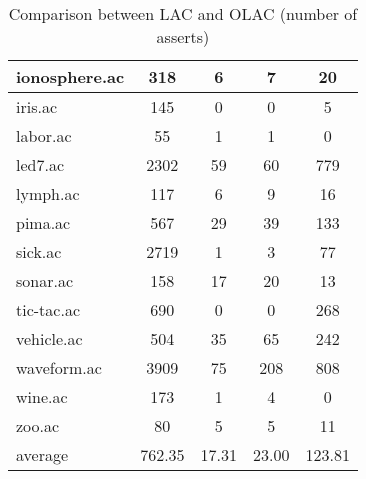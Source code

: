 \begin{table}[htbp]
\begin{tabular}{|l|c|c|c|c|}
		\hline
		ionosphere.ac   & 318           & 6                  & 7                        & 20                            \\
		\hline
		iris.ac         & 145           & 0                  & 0                        & 5                             \\
		\hline
		labor.ac        & 55            & 1                  & 1                        & 0                             \\
		\hline
		led7.ac         & 2302          & 59                 & 60                       & 779                           \\
		\hline
		lymph.ac        & 117           & 6                  & 9                        & 16                            \\
		\hline
		pima.ac         & 567           & 29                 & 39                       & 133                           \\
		\hline
		sick.ac         & 2719          & 1                  & 3                        & 77                            \\
		\hline
		sonar.ac        & 158           & 17                 & 20                       & 13                            \\
		\hline
		tic-tac.ac      & 690           & 0                  & 0                        & 268                           \\
		\hline
		vehicle.ac      & 504           & 35                 & 65                       & 242                           \\
		\hline
		waveform.ac     & 3909          & 75                 & 208                      & 808                           \\
		\hline
		wine.ac         & 173           & 1                  & 4                        & 0                             \\
		\hline
		zoo.ac          & 80            & 5                  & 5                        & 11                            \\
		\hline
		average         & 762.35        & 17.31              & 23.00                    & 123.81                        \\
		\hline
		\end{tabular}
	\caption{Comparison between LAC and OLAC (number of asserts)}
	\label{tab:comparison_lac_olac}
\end{table}